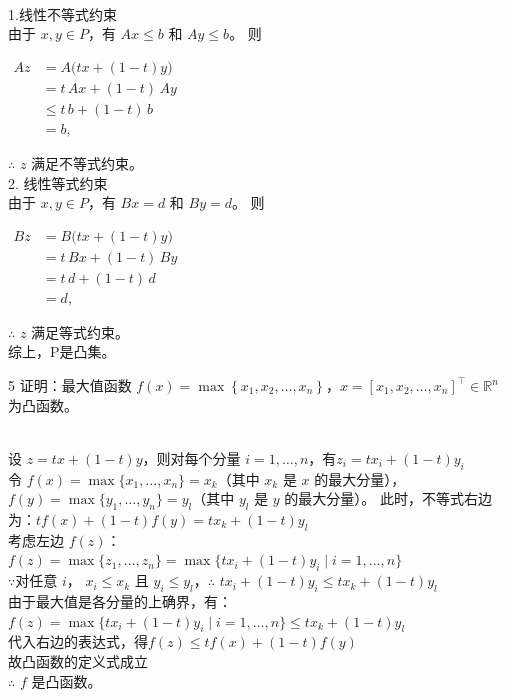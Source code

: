 \documentclass{article}
\newenvironment{problem_cn}[2][问题]{\begin{trivlist}
\item[\hskip \labelsep {\bfseries #1}\hskip \labelsep {\bfseries #2.}]}{\end{trivlist}}
\newenvironment{solution_cn}{%
  \begin{proof}[解答]%
  \kaishu  %
}{%
  \end{proof}%
}
\begin{document}
\begin{solution_cn}
\quad \\
1.线性不等式约束\\
由于 \( x, y \in P \)，有 \( Ax \leq b \) 和 \( Ay \leq b \)。  
则  
\begin{flushleft}
$\begin{aligned}
Az &= A\bigl(tx + (1-t)y\bigr) \\
&= t\,Ax + (1-t)\,Ay \\
&\leq t\,b + (1-t)\,b \\
&= b,
\end{aligned}
$\end{flushleft}
$\therefore$ \( z \) 满足不等式约束。\\  
2. 线性等式约束\\
由于 \( x, y \in P \)，有 \( Bx = d \) 和 \( By = d \)。  
则  
\begin{flushleft}
$\begin{aligned}
Bz &= B\bigl(tx + (1-t)y\bigr) \\
&= t\,Bx + (1-t)\,By \\
&= t\,d + (1-t)\,d \\
&= d,
\end{aligned}
$\end{flushleft}
$\therefore$ \( z \) 满足等式约束。 \\
综上，P是凸集。
\end{solution_cn}
\vspace{0.25in}
\begin{problem_cn}{5}
证明：最大值函数 \( f(x) = \max\left\{ x_1, x_2, \dots, x_n \right\} \)，\( x = [x_1, x_2, \dots, x_n]^\top \in \mathbb{R}^n \)为凸函数。
\end{problem_cn}
\begin{solution_cn}
\quad \\设 \( z = tx + (1-t)y \)，则对每个分量 \( i = 1, \dots, n \)，有$z_i = t x_i + (1-t) y_i$\\
令 \( f(x) = \max\{x_1, \dots, x_n\} = x_k \)（其中 \( x_k \) 是 \( x \) 的最大分量）， \( f(y) = \max\{y_1, \dots, y_n\} = y_l \)（其中 \( y_l \) 是 \( y \) 的最大分量）。  
此时，不等式右边为：$t f(x) + (1-t) f(y) = t x_k + (1-t) y_l$\\
考虑左边 \( f(z) \)：$f(z) = \max\{z_1, \dots, z_n\} = \max\bigl\{ t x_i + (1-t) y_i \mid i = 1, \dots, n \bigr\}$\\
$\because$对任意 \( i \)， \( x_i \leq x_k \) 且 \( y_i \leq y_l \)，$\therefore$ $t x_i + (1-t) y_i \leq t x_k + (1-t) y_l$\\
由于最大值是各分量的上确界，有：$f(z) = \max\bigl\{ t x_i + (1-t) y_i \mid i = 1, \dots, n \bigr\} \leq t x_k + (1-t) y_l$\\
代入右边的表达式，得$f(z) \leq t f(x) + (1-t) f(y)$\\
故凸函数的定义式成立\\
$\therefore$ \( f \) 是凸函数。 
\end{solution_cn}
\end{document}
